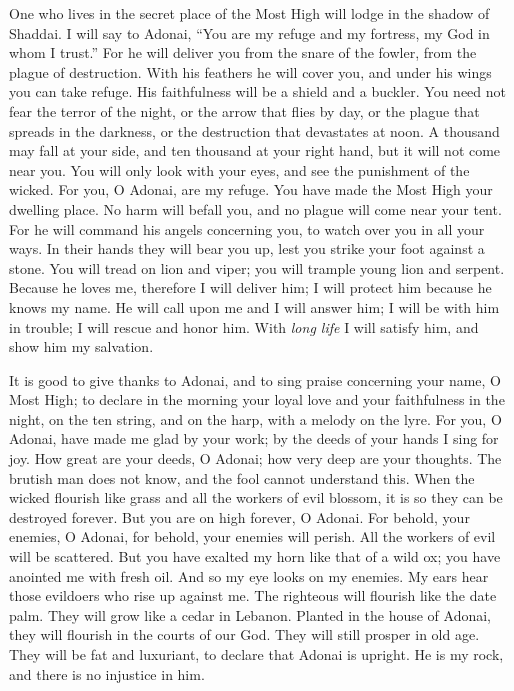 \begin{biblechapter} %
 One who lives in the secret place of the Most High 
will lodge in the shadow of Shaddai.
\verse I will say to Adonai, “You are my refuge and my fortress, 
my God in whom I trust.”
\verse For he will deliver you from the snare of the fowler, 
from the plague of destruction.
\verse With his feathers he will cover you, 
and under his wings you can take refuge. 
His faithfulness will be a shield and a buckler.
\verse You need not fear the terror of the night, 
or the arrow that flies by day,
\verse or the plague that spreads in the darkness, 
or the destruction that devastates at noon.
\verse A thousand may fall at your side, 
and ten thousand at your right hand, 
but it will not come near you.
\verse You will only look with your eyes, 
and see the punishment of the wicked.
\verse For you, O Adonai, are my refuge. 
You have made the Most High your dwelling place.
\verse No harm will befall you, 
and no plague will come near your tent.
\verse For he will command his angels concerning you, 
to watch over you in all your ways.
\verse In their hands they will bear you up, 
lest you strike your foot against a stone.
\verse You will tread on lion and viper; 
you will trample young lion and serpent.
\verse Because he loves me, therefore I will deliver him; 
I will protect him because he knows my name.
\verse He will call upon me and I will answer him; 
I will be with him in trouble; 
I will rescue and honor him.
\verse With \textit{long life} I will satisfy him, 
and show him my salvation.
\end{biblechapter}

\begin{biblechapter} %
 It is good to give thanks to Adonai, 
and to sing praise concerning your name, O Most High;
\verse to declare in the morning your loyal love 
and your faithfulness in the night,
\verse on the ten string, and on the harp, 
with a melody on the lyre.
\verse For you, O Adonai, have made me glad by your work; 
by the deeds of your hands I sing for joy.
\verse How great are your deeds, O Adonai; 
how very deep are your thoughts.
\verse The brutish man does not know, 
and the fool cannot understand this.
\verse When the wicked flourish like grass 
and all the workers of evil blossom, 
it is so they can be destroyed forever.
\verse But you are on high forever, O Adonai.
\verse For behold, your enemies, O Adonai, 
for behold, your enemies will perish. 
All the workers of evil will be scattered.
\verse But you have exalted my horn like that of a wild ox; 
you have anointed me with fresh oil.
\verse And so my eye looks on my enemies. 
My ears hear those evildoers who rise up against me.
\verse The righteous will flourish like the date palm. 
They will grow like a cedar in Lebanon.
\verse Planted in the house of Adonai, 
they will flourish in the courts of our God.
\verse They will still prosper in old age. 
They will be fat and luxuriant,
\verse to declare that Adonai is upright. 
He is my rock, and there is no injustice in him.
\end{biblechapter}

